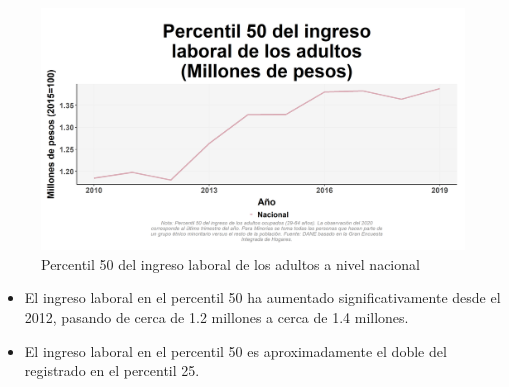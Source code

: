    \begin{figure}[H]
        \caption{Percentil 50 del ingreso laboral de los adultos a nivel nacional \label{map_result_2} }
        \begin{center}
        \includegraphics[width=\textwidth,keepaspectratio]{img/var_20_trend.png}
        \end{center}
    \end{figure}
            \begin{itemize}
                \item El ingreso laboral en el percentil 50 ha aumentado significativamente desde el 2012, pasando de cerca de 1.2 millones a cerca de 1.4 millones.
                \item El ingreso laboral en el percentil 50 es aproximadamente el doble del registrado en el percentil 25.
                \end{itemize}

